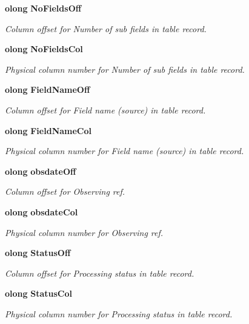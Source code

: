 \begin{CompactItemize}
{\bf olong} {\bf No\-Fields\-Off}
\begin{CompactList}\small\item\em Column offset for Number of sub fields in table record. \item\end{CompactList}\item 
{\bf olong} {\bf No\-Fields\-Col}
\begin{CompactList}\small\item\em Physical column number for Number of sub fields in table record. \item\end{CompactList}\item 
{\bf olong} {\bf Field\-Name\-Off}
\begin{CompactList}\small\item\em Column offset for Field name (source) in table record. \item\end{CompactList}\item 
{\bf olong} {\bf Field\-Name\-Col}
\begin{CompactList}\small\item\em Physical column number for Field name (source) in table record. \item\end{CompactList}\item 
{\bf olong} {\bf obsdate\-Off}
\begin{CompactList}\small\item\em Column offset for Observing ref. \item\end{CompactList}\item 
{\bf olong} {\bf obsdate\-Col}
\begin{CompactList}\small\item\em Physical column number for Observing ref. \item\end{CompactList}\item 
{\bf olong} {\bf Status\-Off}
\begin{CompactList}\small\item\em Column offset for Processing status in table record. \item\end{CompactList}\item 
{\bf olong} {\bf Status\-Col}
\begin{CompactList}\small\item\em Physical column number for Processing status in table record. \item\end{CompactList}\item 

\end{CompactItemize}
